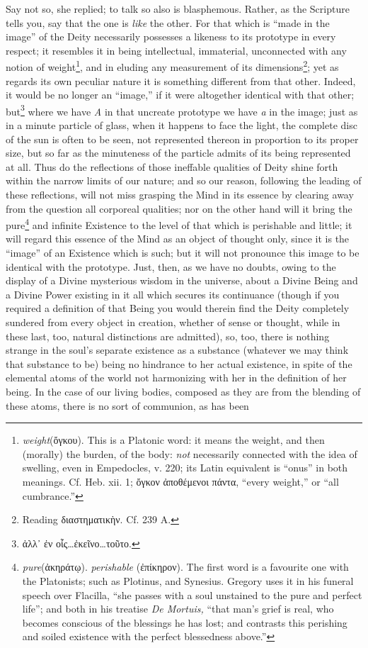 Say not so, she replied; to talk so also is blasphemous. Rather, as the Scripture tells you, say that the one is \emph{like} the other. For that which is “made in the image” of the Deity necessarily possesses a likeness to its prototype in every respect; it resembles it in being intellectual, immaterial, unconnected with any notion of weight\footnote{\emph{weight}(\textgreek{ὄγκου}). This is a Platonic word: it means the weight, and then (morally) the burden, of the body: \emph{not} necessarily connected with the idea of swelling, even in Empedocles, v. 220; its Latin equivalent is “onus” in both meanings. Cf. Heb. xii. 1; \textgreek{ὄγκον ἀποθέμενοι πάντα}, “every weight,” or “all cumbrance.”}, and in eluding any measurement of its dimensions\footnote{Reading \textgreek{διαστηματικὴν}. Cf. 239 A.}; yet as regards its own peculiar nature it is something different from that other. Indeed, it would be no longer an “image,” if it were altogether identical with that other; but\footnote{\textgreek{ἀλλ᾽ ἐν οἷς}…\textgreek{ἐκεῖνο}…\textgreek{τοῦτο}.} where we have \emph{A} in that uncreate prototype we have \emph{a} in the image; just as in a minute particle of glass, when it happens to face the light, the complete disc of the sun is often to be seen, not represented thereon in proportion to its proper size, but so far as the minuteness of the particle admits of its being represented at all. Thus do the reflections of those ineffable qualities of Deity shine forth within the narrow limits of our nature; and so our reason, following the leading of these reflections, will not miss grasping the Mind in its essence by clearing away from the question all corporeal qualities; nor on the other hand will it bring the pure\footnote{\emph{pure}(\textgreek{ἀκηράτῳ}). \emph{perishable} (\textgreek{ἐπίκηρον}). The first word is a favourite one with the Platonists; such as Plotinus, and Synesius. Gregory uses it in his funeral speech over Flacilla, “she passes with a soul unstained to the pure and perfect life”; and both in his treatise \emph{De Mortuis,} “that man’s grief is real, who becomes conscious of the blessings he has lost; and contrasts this perishing and soiled existence with the perfect blessedness above.”} and infinite Existence to the level of that which is perishable and little; it will regard this essence of the Mind as an object of thought only, since it is the “image” of an Existence which is such; but it will not pronounce this image to be identical with the prototype. Just, then, as we have no doubts, owing to the display of a Divine mysterious wisdom in the universe, about a Divine Being and a Divine Power existing in it all which secures its continuance (though if you required a definition of that Being you would therein find the Deity completely sundered from every object in creation, whether of sense or thought, while in these last, too, natural distinctions are admitted), so, too, there is nothing strange in the soul’s separate existence as a substance (whatever we may think that substance to be) being no hindrance to her actual existence, in spite of the elemental atoms of the world not harmonizing with her in the definition of her being. In the case of our living bodies, composed as they are from the blending of these atoms, there is no sort of communion, as has been 